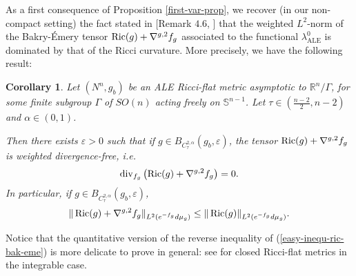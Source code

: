 \documentclass[a4paper,11pt,reqno]{amsart}
\newtheorem{coro}[defn]{Corollary}
\def\RR{\mathbb{R}}
\def\Ric{\mathop{\rm Ric}\nolimits}
\def\div{\mathop{\rm div}\nolimits}
\def\Ric{\mathop{\rm Ric}\nolimits}
\def\div{\mathop{\rm div}\nolimits}
\numberwithin{equation}{section}
\begin{document}
	As a first consequence of Proposition \ref{first-var-prop}, we recover (in our non-compact setting) the fact stated in [Remark $4.6$, \cite{Has-Sta}] that the weighted $L^2$-norm of the Bakry-\'Emery tensor $\Ric(g)+\nabla^{g,2}f_g$ associated to the functional $\lambda_{\operatorname{ALE}}^0$ is dominated by that of the Ricci curvature. More precisely, we have the following result:
	\begin{coro}
		Let $(N^n,g_b)$ be an ALE Ricci-flat metric asymptotic to $\RR^n\slash\Gamma$, for some finite subgroup $\Gamma$ of $SO(n)$ acting freely on $\mathbb{S}^{n-1}$. Let $\tau\in(\frac{n-2}{2},n-2)$ and $\alpha\in(0,1)$. 
		
		Then there exists $\varepsilon>0$ such that if $g\in B_{C^{2,\alpha}_{\tau}}(g_b,\varepsilon)$, the tensor $\Ric(g)+\nabla^{g,2}f_g$ is weighted divergence-free, i.e. 
		\begin{equation}
		\div_{f_g}\left(\Ric(g)+\nabla^{g,2}f_g\right)=0.\label{wei-div-free-obs-ten}
		\end{equation}
		In particular, if $g\in B_{C^{2,\alpha}_{\tau}}(g_b,\varepsilon)$,
		\begin{equation}
		\|\Ric(g)+\nabla^{g,2}f_g\|_{L^2(e^{-f_g}d\mu_g)}\leq \|\Ric(g)\|_{L^2(e^{-f_g}d\mu_g)}.\label{easy-inequ-ric-bak-eme}
		\end{equation}
		
	\end{coro}
	Notice that the quantitative version of the reverse inequality of (\ref{easy-inequ-ric-bak-eme}) is more delicate to prove in general: see \cite[Theorem C]{Has-Sta} for closed Ricci-flat metrics in the integrable case.
	
\end{document}
